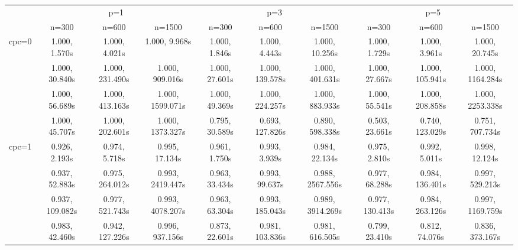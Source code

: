 \documentclass[article]{jss}
\begin{document}
\begin{landscape}

\begin{table}[t!]
  \centering
  \begin{tabular}{@{}cccccccccc@{}}
  \toprule
                          & \multicolumn{3}{c}{p=1}                                            & \multicolumn{3}{c}{p=3}                                            & \multicolumn{3}{c}{p=5}                                            \\
                          & n=300                & n=600                & n=1500               & n=300                & n=600                & n=1500               & n=300                & n=600                & n=1500               \\ \midrule
  \multirow{4}{*}{cpc=0} & 1.000, 1.570s & 1.000, 4.021s & 1.000, 9.968s & 1.000, 1.846s & 1.000, 4.443s & 1.000, 10.256s & 1.000, 1.729s & 1.000, 3.961s & 1.000, 20.745s \\
                          & 1.000, 30.840s & 1.000, 231.490s & 1.000, 909.016s & 1.000, 27.601s & 1.000, 139.578s & 1.000, 401.631s & 1.000, 27.667s & 1.000, 105.941s & 1.000, 1164.284s \\
                          & 1.000, 56.689s & 1.000, 413.163s & 1.000, 1599.071s & 1.000, 49.369s & 1.000, 224.257s & 1.000, 883.933s & 1.000, 55.541s & 1.000, 208.858s & 1.000, 2253.338s \\
                          & 1.000, 45.707s & 1.000, 202.601s & 1.000, 1373.327s & 0.795, 30.589s & 0.693, 127.826s & 0.890, 598.338s & 0.503, 23.661s & 0.740, 123.029s & 0.751, 707.734s \\ \midrule
  \multirow{4}{*}{cpc=1} & 0.926, 2.193s & 0.974, 5.718s & 0.995, 17.134s & 0.961, 1.750s & 0.993, 3.939s & 0.984, 22.134s & 0.975, 2.810s & 0.992, 5.011s & 0.998, 12.124s \\
                          & 0.937, 52.883s & 0.975, 264.012s & 0.993, 2419.447s & 0.963, 33.434s & 0.993, 99.637s & 0.988, 2567.556s & 0.977, 68.288s & 0.984, 136.401s & 0.997, 529.213s \\
                          & 0.937, 109.082s & 0.977, 521.743s & 0.993, 4078.207s & 0.963, 63.304s & 0.993, 185.043s & 0.989, 3914.269s & 0.977, 130.413s & 0.984, 263.126s & 0.997, 1169.759s \\
                          & 0.983, 42.460s & 0.942, 127.226s & 0.996, 937.156s & 0.873, 22.601s & 0.981, 103.836s & 0.981, 616.505s & 0.799, 23.410s & 0.812, 74.076s & 0.836, 373.167s \\ \midrule

\end{tabular}
\end{table}
\end{landscape}
\end{document}
